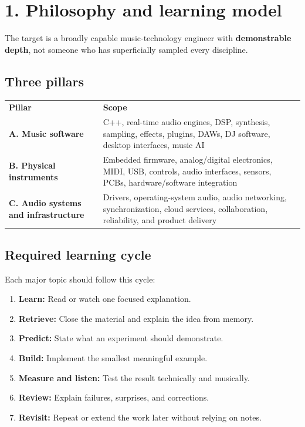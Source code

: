 \documentclass[11pt,letterpaper]{article}
\begin{document}
\section{1. Philosophy and learning model}\label{philosophy-and-learning-model}

The target is a broadly capable music-technology engineer with \textbf{demonstrable depth}, not someone who has superficially sampled every discipline.

\subsection*{Three pillars}\label{three-pillars}

\begin{center}
\small
\begin{tabular}{>{\raggedright\arraybackslash}p{}>{\raggedright\arraybackslash}p{}}
\textbf{Pillar} & \textbf{Scope} \\
\textbf{A. Music software} & C++, real-time audio engines, DSP, synthesis, sampling, effects, plugins, DAWs, DJ software, desktop interfaces, music AI \\
\textbf{B. Physical instruments} & Embedded firmware, analog/digital electronics, MIDI, USB, controls, audio interfaces, sensors, PCBs, hardware/software integration \\
\textbf{C. Audio systems and infrastructure} & Drivers, operating-system audio, audio networking, synchronization, cloud services, collaboration, reliability, and product delivery \\
\end{tabular}
\end{center}

\subsection*{Required learning cycle}\label{required-learning-cycle}

Each major topic should follow this cycle:

\begin{enumerate}
\item \textbf{Learn:} Read or watch one focused explanation.
\item \textbf{Retrieve:} Close the material and explain the idea from memory.
\item \textbf{Predict:} State what an experiment should demonstrate.
\item \textbf{Build:} Implement the smallest meaningful example.
\item \textbf{Measure and listen:} Test the result technically and musically.
\item \textbf{Review:} Explain failures, surprises, and corrections.
\item \textbf{Revisit:} Repeat or extend the work later without relying on notes.
\end{enumerate}
\end{document}
